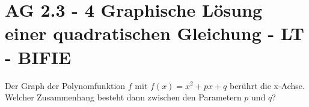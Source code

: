 \section{AG 2.3 - 4 Graphische Lösung einer quadratischen Gleichung  - LT - BIFIE}

\begin{beispiel}[AG 2.3]{1} %
			Der Graph der Polynomfunktion $f$ mit $f(x)=x^2+px+q$ berührt die x-Achse. Welcher Zusammenhang besteht dann zwischen den Parametern $p$ und $q$?
				
\end{beispiel}